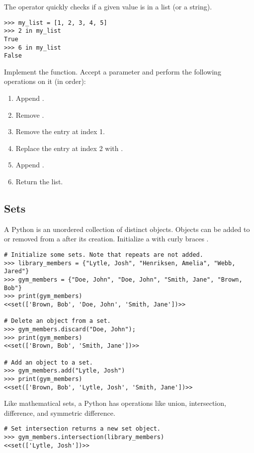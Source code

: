 The  operator quickly checks if a given value is in a list (or a string).
\begin{lstlisting}
>>> my_list = [1, 2, 3, 4, 5]
>>> 2 in my_list
True
>>> 6 in my_list
False
\end{lstlisting}

\begin{problem}
Implement the  function.
Accept a parameter  and perform the following operations on it (in order):
\begin{enumerate}
\item Append .
\item Remove .
\item Remove the entry at index 1.
\item Replace the entry at index 2 with .
\item Append .
\item Return the list.
\end{enumerate}
\end{problem}


\subsection*{Sets}
A Python  is an unordered collection of distinct objects.
Objects can be added to or removed from a  after its creation.
Initialize a  with curly braces \li{\{ \}}.
\begin{lstlisting}
# Initialize some sets. Note that repeats are not added.
>>> library_members = {"Lytle, Josh", "Henriksen, Amelia", "Webb, Jared"}
>>> gym_members = {"Doe, John", "Doe, John", "Smith, Jane", "Brown, Bob"}
>>> print(gym_members)
<<set(['Brown, Bob', 'Doe, John', 'Smith, Jane'])>>

# Delete an object from a set.
>>> gym_members.discard("Doe, John");
>>> print(gym_members)
<<set(['Brown, Bob', 'Smith, Jane'])>>

# Add an object to a set.
>>> gym_members.add("Lytle, Josh")
>>> print(gym_members)
<<set(['Brown, Bob', 'Lytle, Josh', 'Smith, Jane'])>>
\end{lstlisting}

Like mathematical sets, a Python  has operations like union, intersection, 
difference, and symmetric difference.
\begin{lstlisting}
# Set intersection returns a new set object.
>>> gym_members.intersection(library_members)
<<set(['Lytle, Josh'])>>
\end{lstlisting}

